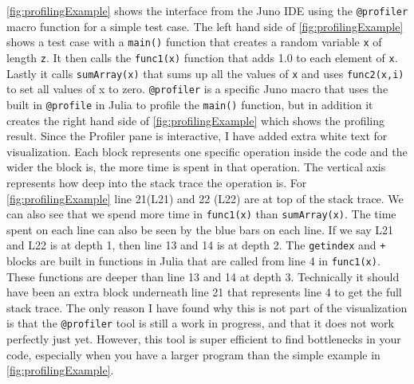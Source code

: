 \autoref{fig:profilingExample} shows the interface from the Juno IDE using the \texttt{@profiler} macro function \emph{\citep{JunoProfilerMacro}} for a simple test case. The left hand side of \autoref{fig:profilingExample} shows a test case with a \texttt{main()} function that creates a random variable \texttt{x} of length \texttt{z}. It then  calls the \texttt{func1(x)} function that adds 1.0 to each element of \texttt{x}. Lastly it calls \texttt{sumArray(x)} that sums up all the values of \texttt{x} and uses \texttt{func2(x,i)} to set all values of x to zero. \texttt{@profiler} is a specific Juno macro that uses the built in \texttt{@profile} in Julia \emph{\citep{Profile.jl}} to profile the \texttt{main()} function, but in addition it creates the right hand side of \autoref{fig:profilingExample} which shows the profiling result. Since the Profiler pane is interactive, I have added extra white text for visualization. Each block represents one specific operation inside the code and the wider the block is, the more time is spent in that operation. The vertical axis represents how deep into the stack trace the operation is. For \autoref{fig:profilingExample} line 21(L21) and 22 (L22) are at top of the stack trace. We can also see that we spend more time in \texttt{func1(x)} than \texttt{sumArray(x)}. The time spent on each line can also be seen by the blue bars on each line. If we say  L21 and L22 is at depth 1, then line 13 and 14 is at depth 2. The \texttt{getindex} and \texttt{+} blocks are built in functions in Julia that are called from line 4 in \texttt{func1(x)}. These functions are deeper than line 13 and 14 at depth 3. Technically it should have been an extra block underneath line 21 that represents line 4 to get the full stack trace. The only reason I have found why this is not part of the visualization is that the \texttt{@profiler} tool is still a work in progress, and that it does not work perfectly just yet. However, this tool is super efficient to find bottlenecks in your code, especially when you have a larger program than the simple example in \autoref{fig:profilingExample}. 
